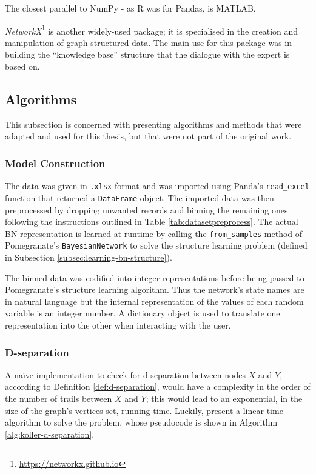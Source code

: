 The closest parallel to NumPy - as R was for Pandas, is MATLAB.

\textit{NetworkX}\footnote{\url{https://networkx.github.io}} is another widely-used package; it is specialised in the creation and manipulation of graph-structured data.
The main use for this package was in building the \enquote{knowledge base} structure that  the dialogue with the expert is based on.

\subsection{Algorithms} \label{subsec:algorithms}
This subsection is concerned with presenting algorithms and methods that were adapted and used for this thesis, but that were not part of the original work.

\subsubsection{Model Construction}
The data was given in \texttt{.xlsx} format and was imported using Panda's \texttt{read\_excel} function that returned a \texttt{DataFrame} object.
The imported data was then preprocessed by dropping unwanted records and binning the remaining ones following the instructions outlined in Table \ref{tab:datasetpreprocess}.
The actual BN representation is learned at runtime by calling the \texttt{from\_samples} method of Pomegranate's \texttt{BayesianNetwork} to solve the structure learning problem (defined in Subsection \ref{subsec:learning-bn-structure}).

The binned data was codified into integer representations before being passed to Pomegranate's structure learning algorithm.
Thus the network's state names are in natural language but the internal representation of the values of each random variable is an integer number.
A dictionary object is used to translate one representation into the other when interacting with the user.

\subsubsection{D-separation}
A na{\"i}ve implementation to check for d-separation between nodes $X$ and $Y$, according to Definition \ref{def:d-separation}, would have a complexity in the order of the number of trails between $X$ and $Y$; this would lead to an exponential, in the size of the graph's vertices set, running time.
Luckily, \citet{koller2007} present a linear time algorithm to solve the problem, whose pseudocode is shown in Algorithm \ref{alg:koller-d-separation}.

